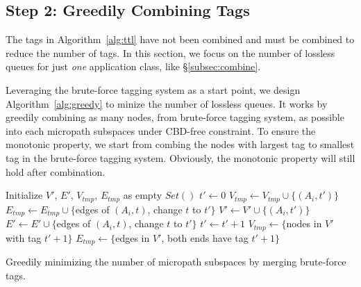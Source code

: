 
\subsection{Step 2: Greedily Combining Tags} 

The tags in Algorithm~\ref{alg:ttl} have not been combined and must be combined
to reduce the number of tags. In this section, we focus on the number of lossless 
queues for just {\em one} application class, like \S\ref{subsec:combine}.

Leveraging the brute-force tagging system as a start
point, we design Algorithm~\ref{alg:greedy} to minize the number of lossless
queues. It works by greedily combining as many nodes, from brute-force tagging
system, as possible into each micropath subspaces under CBD-free constraint. To
ensure the monotonic property, we start from combing the nodes with largest tag
to smallest tag in the brute-force tagging system.  Obviously, the monotonic
property will still hold after combination. 

\begin{algorithm}
	\small
	Initialize $V'$, $E'$, $V_{tmp}$, $E_{tmp}$ as empty $Set()$\;
	$t' \gets 0$\;
	 {
		 {
			$V_{tmp} \gets V_{tmp} \cup \{(A_i, t')\}$\;
			$E_{tmp} \gets E_{tmp} \cup \{$edges of $(A_i, t)$, change $t$ to $t'\}$\;
			 {
				$V' \gets V' \cup \{(A_i, t')\}$\;
				$E' \gets E' \cup \{$edges of $(A_i, t)$, change $t$ to $t'\}$\; 
			}
		}
		 {
			$t' \gets t'+1$\;
			$V_{tmp} \gets \{$nodes in $V'$ with tag $t'+1\}$\;
			$E_{tmp} \gets \{$edges in $V'$, both ends have tag $t'+1\}$\;
		}
	}
	\;
    \caption{Greedily minimizing the number of micropath subspaces by merging brute-force tags.}
	\label{alg:greedy}
\end{algorithm}

